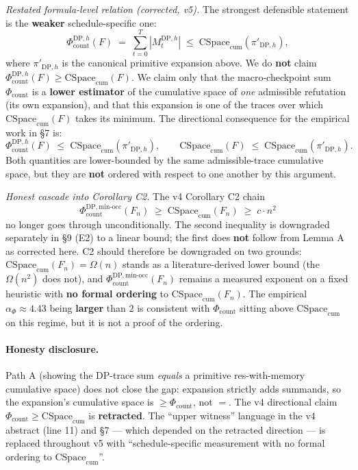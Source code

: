 \documentclass[11pt,a4paper]{article}
\theoremstyle{remark}
\begin{document}
\textit{Restated formula-level relation (corrected, v5).} The strongest
defensible statement is the \textbf{weaker} schedule-specific one:
\[
\Phi_{\mathrm{count}}^{\mathrm{DP},h}(F) \;=\;
\sum_{t=0}^{T} |M_t^{\mathrm{DP},h}| \;\le\;
\mathrm{CSpace}_{\mathrm{cum}}(\pi'_{\mathrm{DP},h}),
\]
where $\pi'_{\mathrm{DP},h}$ is the canonical primitive expansion above.
We do \textbf{not} claim
$\Phi_{\mathrm{count}}^{\mathrm{DP},h}(F) \ge
\mathrm{CSpace}_{\mathrm{cum}}(F)$. We claim only that the
macro-checkpoint sum $\Phi_{\mathrm{count}}$ is a \textbf{lower estimator}
of the cumulative space of \emph{one} admissible refutation (its own
expansion), and that this expansion is one of the traces over which
$\mathrm{CSpace}_{\mathrm{cum}}(F)$ takes its minimum. The directional
consequence for the empirical work in \S7 is:
\[
\Phi_{\mathrm{count}}^{\mathrm{DP},h}(F) \;\le\;
\mathrm{CSpace}_{\mathrm{cum}}(\pi'_{\mathrm{DP},h}), \qquad
\mathrm{CSpace}_{\mathrm{cum}}(F) \;\le\;
\mathrm{CSpace}_{\mathrm{cum}}(\pi'_{\mathrm{DP},h}).
\]
Both quantities are lower-bounded by the same admissible-trace cumulative
space, but they are \textbf{not} ordered with respect to one another by
this argument.

\begingroup\sloppy
\textit{Honest cascade into Corollary C2.} The v4 Corollary C2 chain
\[
\Phi_{\mathrm{count}}^{\mathrm{DP},\mathrm{min\text{-}occ}}(F_n) \;\ge\;
\mathrm{CSpace}_{\mathrm{cum}}(F_n) \;\ge\; c \cdot n^2
\]
no longer goes through unconditionally. The second inequality is downgraded
separately in \S9 (E2) to a linear bound; the first does \textbf{not}
follow from Lemma A as corrected here. C2 should therefore be downgraded
on two grounds: $\mathrm{CSpace}_{\mathrm{cum}}(F_n) = \Omega(n)$ stands
as a literature-derived lower bound (the $\Omega(n^2)$ does not), and
$\Phi_{\mathrm{count}}^{\mathrm{DP},\mathrm{min\text{-}occ}}(F_n)$ remains
a measured exponent on a fixed heuristic with \textbf{no formal ordering}
to $\mathrm{CSpace}_{\mathrm{cum}}(F_n)$. The empirical
$\alpha_{\Phi} \approx 4.43$ being \textbf{larger} than $2$ is consistent
with $\Phi_{\mathrm{count}}$ sitting above $\mathrm{CSpace}_{\mathrm{cum}}$
on this regime, but it is not a proof of the ordering.\endgroup

\paragraph{Honesty disclosure.} Path A (showing the DP-trace sum
\emph{equals} a primitive res-with-memory cumulative space) does not close
the gap: expansion strictly adds summands, so the expansion's cumulative
space is $\ge \Phi_{\mathrm{count}}$, not $=$. The v4 directional claim
$\Phi_{\mathrm{count}} \ge \mathrm{CSpace}_{\mathrm{cum}}$ is
\textbf{retracted}. The ``upper witness'' language in the v4 abstract
(line 11) and \S7 --- which depended on the retracted direction --- is
replaced throughout v5 with ``schedule-specific measurement with no formal
ordering to $\mathrm{CSpace}_{\mathrm{cum}}$''.
\end{document}
